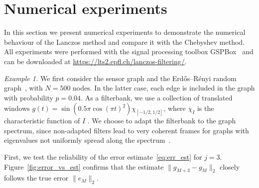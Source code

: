 \documentclass{article}
\begin{document}
\section{Numerical experiments}

In this section we present numerical experiments to demonstrate the numerical behaviour of the Lanczos method and compare it with the Chebyshev method. All experiments were performed with the signal processing toolbox GSPBox~\cite{perraudin2014gspbox} and can be downloaded at \url{https://lts2.epfl.ch/lanczos-filtering/}. 

\textit{Example 1.} We first consider the sensor graph and the Erd{\H o}s--R{\'e}nyi random graph~\cite{erdHos1959random}, with $N = 500$ nodes. In the latter case, each edge is included in the graph with probability $p = 0.04$. As a filterbank, we use a collection of translated windows $g(t) = \sin(0.5\pi\cos(\pi t)^2)\chi_{[-1/2,1/2]}$, where $\chi_{I}$ is the characteristic function of $I$ \cite{wesfreid1993adapted}. 
We choose to adapt the filterbank to the graph spectrum, since non-adapted filters lead to very coherent frames for graphs with eigenvalues not uniformly spread along the spectrum~\cite{shuman2013spectrum}. 

First, we test the reliability of the error estimate~\eqref{eq:err_est} for $j = 3$. Figure~\ref{fig:error_vs_est} confirms that the estimate
$\|g_{M+3} - g_{M}\|_2$ closely follows the true error $\|e_M\|_2$.
\end{document}
